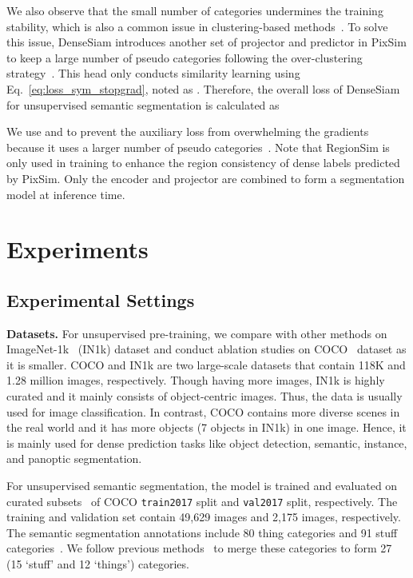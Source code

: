 \documentclass[runningheads]{llncs}
\newcommand{\myparagraph}[1]{{\noindent\bf #1}}
\begin{document}
We also observe that the small number of categories undermines the training stability, which is also a common issue in clustering-based methods~\cite{picie, iic}.
To solve this issue, DenseSiam introduces another set of projector and predictor in PixSim to keep a large number of pseudo categories following the over-clustering strategy~\cite{picie, iic}.
This head only conducts similarity learning using Eq.~\ref{eq:loss_sym_stopgrad}, noted as .
Therefore, the overall loss of DenseSiam for unsupervised semantic segmentation is calculated as

We use  and 
to prevent the auxiliary loss from overwhelming the gradients because it uses a larger number  of pseudo categories~\cite{picie}.
Note that RegionSim is only used in training to enhance the region consistency of dense labels predicted by PixSim.
Only the encoder  and projector  are combined to form a segmentation model at inference time.


 

\section{Experiments}\label{sec:Experiments:representation}

\subsection{Experimental Settings}\label{sec:exps:settings}
\myparagraph{Datasets.}
For unsupervised pre-training,
we compare with other methods on ImageNet-1k~\cite{ILSVRC15} (IN1k) dataset and conduct ablation studies on COCO~\cite{coco} dataset as it is smaller.
COCO and IN1k are two large-scale datasets that contain 118K and 1.28 million images, respectively.
Though having more images, IN1k is highly curated and it mainly consists of object-centric images. Thus, the data  is usually used for image classification.
In contrast, COCO contains more diverse scenes in the real world and it has more objects (7 objects  in IN1k) in one image. Hence, it is mainly used for dense prediction tasks like object detection, semantic, instance, and panoptic segmentation.

For unsupervised semantic segmentation,
the model is trained and evaluated on curated subsets~\cite{iic,picie} of COCO \texttt{train2017} split and \texttt{val2017} split, respectively.
The training and validation set contain 49,629 images and 2,175 images, respectively.
The semantic segmentation annotations include 80 thing categories and 91 stuff categories~\cite{caesar2018coco}.
We follow previous methods~\cite{picie, iic} to merge these categories to form 27 (15 `stuff' and 12 `things') categories. 
\end{document}
